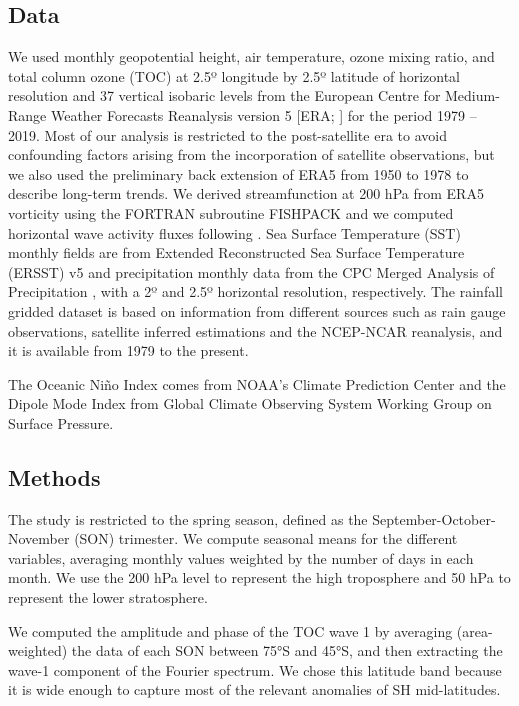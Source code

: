 \documentclass[pdflatex,lineno,sn-basic]{sn-jnl}
\theoremstyle{thmstyleone}%
\theoremstyle{thmstyletwo}%
\theoremstyle{thmstylethree}%
\begin{document}
\hypertarget{data}{%
\subsection{Data}\label{data}}

We used monthly geopotential height, air temperature, ozone mixing ratio, and total column ozone (TOC) at 2.5º longitude by 2.5º latitude of horizontal resolution and 37 vertical isobaric levels from the European Centre for Medium-Range Weather Forecasts Reanalysis version 5 {[}ERA; \citet{era5}{]} for the period 1979 -- 2019.
Most of our analysis is restricted to the post-satellite era to avoid confounding factors arising from the incorporation of satellite observations, but we also used the preliminary back extension of ERA5 from 1950 to 1978 \citep{era5be} to describe long-term trends.
We derived streamfunction at 200 hPa from ERA5 vorticity using the FORTRAN subroutine FISHPACK \citep{fishpack} and we computed horizontal wave activity fluxes following \citet{plumb1985}.
Sea Surface Temperature (SST) monthly fields are from Extended Reconstructed Sea Surface Temperature (ERSST) v5 \citep{huang2017} and precipitation monthly data from the CPC Merged Analysis of Precipitation \citep[CMAP,][]{cmap}, with a 2º and 2.5º horizontal resolution, respectively.
The rainfall gridded dataset is based on information from different sources such as rain gauge observations, satellite inferred estimations and the NCEP-NCAR reanalysis, and it is available from 1979 to the present.

The Oceanic Niño Index \citep[ONI,][]{bamston1997} comes from NOAA's Climate Prediction Center and the Dipole Mode Index \citep[DMI,][]{saji2003} from Global Climate Observing System Working Group on Surface Pressure.

\hypertarget{methods-1}{%
\subsection{Methods}\label{methods-1}}

The study is restricted to the spring season, defined as the September-October-November (SON) trimester.
We compute seasonal means for the different variables, averaging monthly values weighted by the number of days in each month.
We use the 200 hPa level to represent the high troposphere and 50 hPa to represent the lower stratosphere.

We computed the amplitude and phase of the TOC wave 1 by averaging (area-weighted) the data of each SON between 75°S and 45°S, and then extracting the wave-1 component of the Fourier spectrum.
We chose this latitude band because it is wide enough to capture most of the relevant anomalies of SH mid-latitudes.
\end{document}

